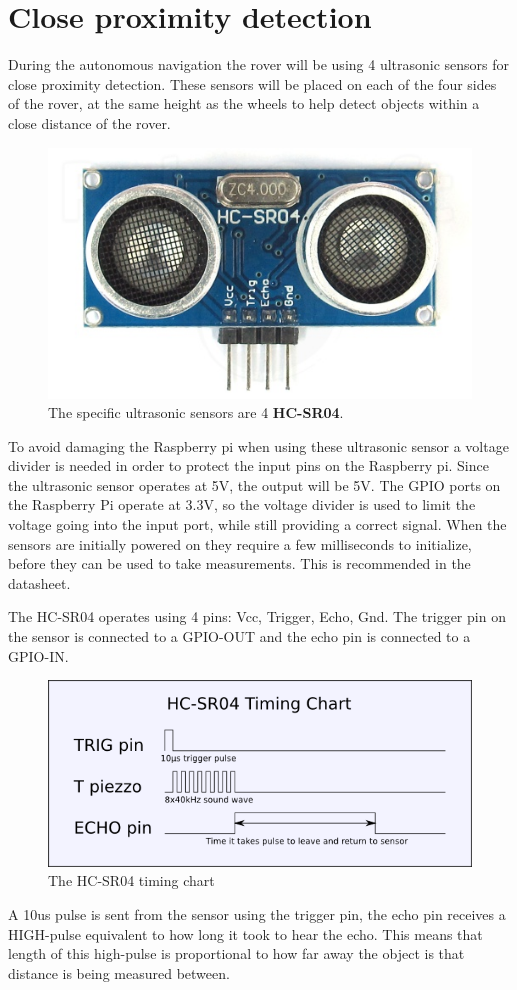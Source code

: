 \clearpage
\section{Close proximity detection}

During the autonomous navigation the rover will be using 4 ultrasonic sensors for close proximity detection. These sensors will be placed on each of the four sides of the rover, at the same height as the wheels to help detect objects within a close distance of the rover.

\begin{figure}[H]
	\centering
	\includegraphics[width=.3\linewidth]{images/hcsr40.jpg}
	\caption{The specific ultrasonic sensors are 4 \textbf{HC-SR04}.}
\end{figure}


To avoid damaging the Raspberry pi  when using these ultrasonic sensor a voltage divider is needed in order to protect the input pins on the Raspberry pi. Since the ultrasonic sensor operates at 5V, the output will be 5V. The GPIO ports on the Raspberry Pi operate at 3.3V, so the voltage divider is used to limit the voltage going into the input port, while still providing a correct signal.
When the sensors are initially powered on they require a few milliseconds to initialize, before they can be used to take measurements. This is recommended in the datasheet.

The HC-SR04 operates using 4 pins: Vcc, Trigger, Echo, Gnd.
The trigger pin on the sensor is connected to a GPIO-OUT and the echo pin is connected to a GPIO-IN.

\begin{figure}[H]
	\centering
	\includegraphics[width=.5\linewidth]{images/hcsr04timingchart.png}
	\caption{The HC-SR04 timing chart\cite{hcsr04timingchart}}
\end{figure}

A 10us pulse is sent from the sensor using the trigger pin, the echo pin receives a HIGH-pulse equivalent to how long it took to hear the echo. This means that length of this high-pulse is proportional to how far away the object is that distance is being measured between.\cite{ultrasonichowitworks}

